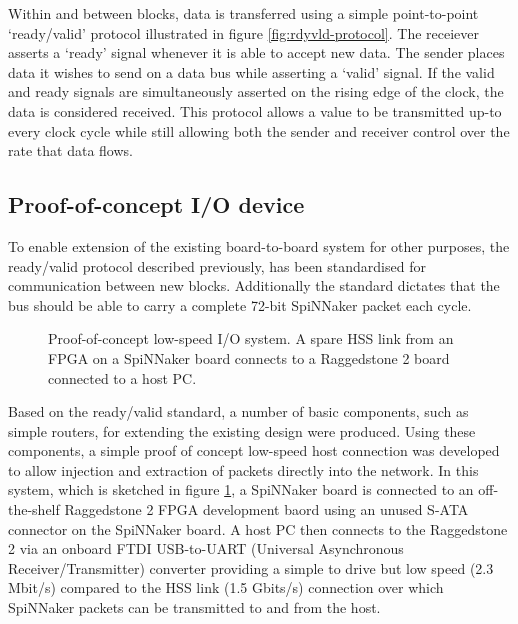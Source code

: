 				Within and between blocks, data is transferred using a simple
				point-to-point `ready/valid' protocol illustrated in figure
				\ref{fig:rdyvld-protocol}.  The receiever asserts a `ready' signal
				whenever it is able to accept new data. The sender places data it wishes
				to send on a data bus while asserting a `valid' signal. If the valid and
				ready signals are simultaneously asserted on the rising edge of the
				clock, the data is considered received. This protocol allows a value to
				be transmitted up-to every clock cycle while still allowing both the
				sender and receiver control over the rate that data flows.
			
			\subsection{Proof-of-concept I/O device}
				
				
				To enable extension of the existing board-to-board system for other
				purposes, the ready/valid protocol described previously, has been
				standardised for communication between new blocks. Additionally the
				standard dictates that the bus should be able to carry a complete 72-bit
				SpiNNaker packet each cycle.
				
				\begin{figure}
					\center
					
					
					\caption[Proof-of-concept low-speed I/O system.]{Proof-of-concept
					low-speed I/O system. A spare HSS link from an FPGA on a SpiNNaker
					board connects to a Raggedstone 2 board connected to a host PC.}
					\label{fig:proof-of-concept-fpga-links}
				\end{figure}
				
				Based on the ready/valid standard, a number of basic components, such as
				simple routers, for extending the existing design were produced. Using
				these components, a simple proof of concept low-speed host connection
				was developed to allow injection and extraction of packets directly into
				the network. In this system, which is sketched in figure
				\ref{fig:proof-of-concept-fpga-links}, a SpiNNaker board is connected to
				an off-the-shelf Raggedstone 2 FPGA development baord
				\cite{raggedstone2} using an unused S-ATA connector on the SpiNNaker
				board. A host PC then connects to the Raggedstone 2 via an onboard FTDI
				USB-to-UART (Universal Asynchronous Receiver/Transmitter) converter
				providing a simple to drive but low speed (2.3 Mbit/s) compared to the
				HSS link (1.5 Gbits/s) connection over which SpiNNaker packets can be
				transmitted to and from the host.
				
